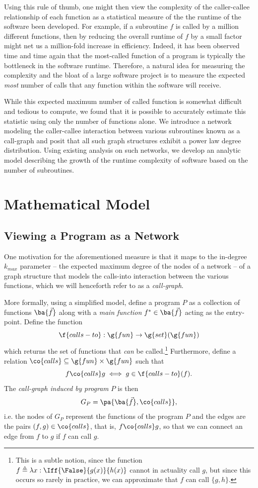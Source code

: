 \documentclass[11pt,a4paper,twocolumn]{article}
\begin{document}
\begin{singlespace}
Using this rule of thumb, one might then view the complexity of the caller-callee
relationship of each function as a statistical measure of the the runtime of the
software been developed. For example, if a subroutine $f$ is called by a million
different functions, then by reducing the overall runtime of $f$ by a small factor
might net us a million-fold increase in efficiency. Indeed, it has been observed
time and time again \cite{BENCH} that the most-called function of a program
is typically the bottleneck in the software runtime. Therefore, a natural idea for
measuring the complexity and the bloat of a large software project is to measure
the expected \emph{most} number of calls that any function within the software
will receive.

While this expected maximum number of called function is somewhat difficult and
tedious to compute, we found that it is possible to accurately
estimate this statistic using only the number of functions alone. We introduce a
network modeling the caller-callee interaction between various subroutines known
as a call-graph and posit that all such graph structures exhibit a power law degree
distribution. Using existing analysis on such networks, we develop an analytic
model describing the growth of the runtime complexity of software based on the
number of subroutines.

\section{Mathematical Model}
\subsection{Viewing a Program as a Network}
One motivation for the aforementioned measure is that it maps to the in-degree
$k_{max}$ parameter -- the expected maximum degree of the nodes of a network --
of a graph structure that models the calls-into interaction between the various
functions, which we will henceforth refer to as a \emph{call-graph}.

More formally, using a simplified model, define a program $P$ as a collection
of functions $\ba{\vec{f}}$ along with a \emph{main function}
$f^{\ast}\in\ba{\vec{f}}$ acting as the entry-point. Define the function
\[\f{calls-to}:\g{fun}\to\g{set}(\g{fun})\]
which returns the set of functions that \emph{can} be called.\footnote{This is
a subtle notion, since the function $f\triangleq\lambda x: \Iff{\False}{g(x)}
{h(x)}$ cannot in actuality call $g$, but since this occurs so rarely in
practice, we can approximate that $f$ can call $\{g,h\}$.} Furthermore, define
a relation $\co{calls}\subseteq\g{fun}\times\g{fun}$ such that
\[f\co{calls} g \iff g \in \f{calls-to}(f).\]
The \emph{call-graph induced by program} $P$ is then
\[G_P=\pa{\ba{\vec{f}},\co{calls}},\]
i.e. the nodes of $G_P$ represent the functions of the program $P$ and the
edges are the pairs $(f,g)\in\co{calls}$, that is, $f\co{calls} g$, so that
we can connect an edge from $f$ to $g$ if $f$ can call $g$.


\end{singlespace}
\end{document}
